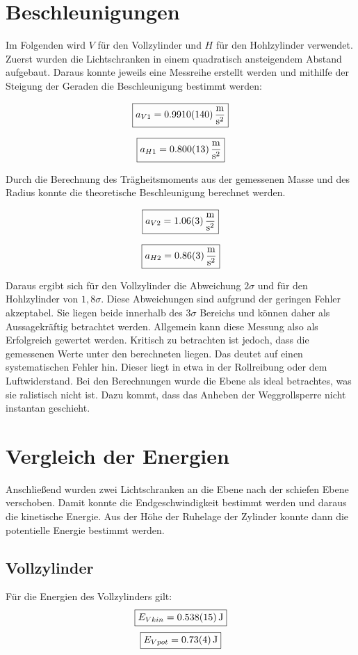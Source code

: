 \section{Beschleunigungen}
Im Folgenden wird $V$ für den Vollzylinder und $H$ für den Hohlzylinder verwendet.\\

Zuerst wurden die Lichtschranken in einem quadratisch ansteigendem Abstand aufgebaut.
Daraus konnte jeweils eine Messreihe erstellt werden und mithilfe der Steigung der Geraden die Beschleunigung bestimmt werden:

\[\boxed{a_{V1} = \SI{ 0,9910 \pm 0,014 }{\frac{\meter}{\second^2}}}\]

\[\boxed{a_{H1} = \SI{ 0,800 \pm 0,013}{\frac{\meter}{\second^2}}}\]

Durch die Berechnung des Trägheitsmoments aus der gemessenen Masse und des Radius konnte die theoretische Beschleunigung berechnet werden.

\[\boxed{a_{V2} = \SI{1,06 \pm 0,03}{\frac{\meter}{\second^2}}}\]

\[\boxed{a_{H2} =  \SI{0,86 \pm 0,03}{\frac{\meter}{\second^2}}}\]

Daraus ergibt sich für den Vollzylinder die Abweichung $2 \sigma$ und für den Hohlzylinder von $1,8 \sigma$.
Diese Abweichungen sind aufgrund der geringen Fehler akzeptabel. Sie liegen beide innerhalb des $3 \sigma$ Bereichs und können
daher als Aussagekräftig betrachtet werden. Allgemein kann diese Messung also als Erfolgreich gewertet werden.
Kritisch zu betrachten ist jedoch, dass die gemessenen Werte unter den berechneten liegen. Das deutet auf einen systematischen Fehler hin.
Dieser liegt in etwa in der Rollreibung oder dem Luftwiderstand. Bei den Berechnungen wurde die Ebene als ideal betrachtes, was sie ralistisch nicht ist.
Dazu kommt, dass das Anheben der Weggrollsperre nicht instantan geschieht.

\section{Vergleich der Energien}
Anschließend wurden zwei Lichtschranken an die Ebene nach der schiefen Ebene verschoben. Damit konnte die Endgeschwindigkeit bestimmt werden und daraus die kinetische Energie.
Aus der Höhe der Ruhelage der Zylinder konnte dann die potentielle Energie bestimmt werden.
\subsection{Vollzylinder}
Für die Energien des Vollzylinders gilt:
\[\boxed{E_{V kin} = \SI{0,538 \pm 0,015}{\joule}}\]
\[\boxed{E_{V pot} = \SI{0,73 \pm 0,04}{\joule}}\]


